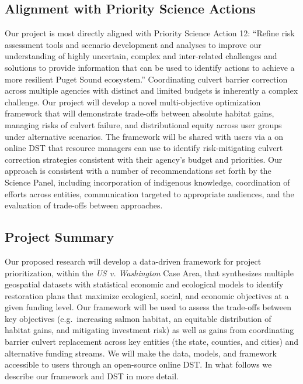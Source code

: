 \documentclass[12pt]{elsarticle}
\begin{document}
	\subsection{Alignment with Priority Science Actions} %
	
	Our project is most directly aligned with Priority Science Action 12: ``Refine risk assessment tools and scenario development and analyses to improve our understanding of highly uncertain, complex and inter-related challenges and solutions to provide information that can be used to identify actions to achieve a more resilient Puget Sound ecosystem.'' Coordinating culvert barrier correction across multiple agencies with distinct and limited budgets is inherently a complex challenge. Our project will develop a novel multi-objective optimization framework that will demonstrate trade-offs between absolute habitat gains, managing risks of culvert failure, and distributional equity across user groups under alternative scenarios. The framework will be shared with users via a on online DST that resource managers can use to identify risk-mitigating culvert correction strategies consistent with their agency's budget and priorities. Our approach is consistent with a number of recommendations set forth by the Science Panel, including incorporation of indigenous knowledge, coordination of efforts across entities, communication targeted to appropriate audiences, and the evaluation of trade-offs between approaches.
	
	\subsection{Project Summary}\label{sec:summary} %
	
	Our proposed research will develop a data-driven framework for project prioritization, within the \textit{US v. Washington} Case Area, that synthesizes multiple geospatial datasets with statistical economic and ecological models to identify restoration plans that maximize ecological, social, and economic objectives at a given funding level. Our framework will be used to assess the trade-offs between key objectives (e.g.\ increasing salmon habitat, an equitable distribution of habitat gains, and mitigating investment risk) as well as gains from coordinating barrier culvert replacement across key entities (the state, counties, and cities) and alternative funding streams. We will make the data, models, and framework accessible to users through an open-source online DST. In what follows we describe our framework and DST in more detail.
	
\end{document}

